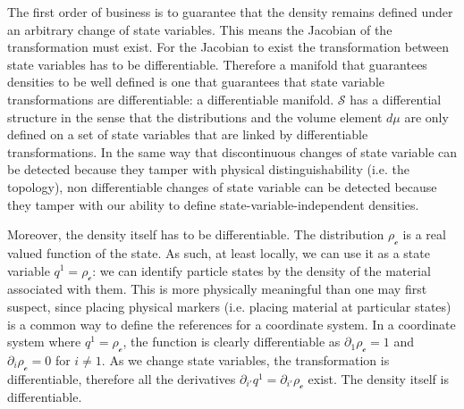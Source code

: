 \documentclass[aps,pra,10pt,twocolumn,floatfix,nofootinbib]{revtex4-1}
\numberwithin{equation}{section}
\theoremstyle{definition}
\begin{document}
The first order of business is to guarantee that the density remains defined under an arbitrary change of state variables. This means the Jacobian of the transformation must exist. For the Jacobian to exist the transformation between state variables has to be differentiable. Therefore a manifold that guarantees densities to be well defined is one that guarantees that state variable transformations are differentiable: a differentiable manifold. $\mathcal{S}$ has a differential structure in the sense that the distributions and the volume element $d\mu$ are only defined on a set of state variables that are linked by differentiable transformations. In the same way that discontinuous changes of state variable can be detected because they tamper with physical distinguishability (i.e. the topology), non differentiable changes of state variable can be detected because they tamper with our ability to define state-variable-independent densities.

Moreover, the density itself has to be differentiable. The distribution $\rho_\mathcal{c}$ is a real valued function of the state. As such, at least locally, we can use it as a state variable $q^1=\rho_\mathcal{c}$: we can identify particle states by the density of the material associated with them. This is more physically meaningful than one may first suspect, since placing physical markers (i.e. placing material at particular states) is a common way to define the references for a coordinate system. In a coordinate system where $q^1=\rho_\mathcal{c}$, the function is clearly differentiable as $\partial_1 \rho_\mathcal{c} = 1$ and $\partial_i \rho_\mathcal{c} = 0$ for $i \neq 1$. As we change state variables, the transformation is differentiable, therefore all the derivatives $\partial_{i'} q^1 = \partial_{i'} \rho_\mathcal{c}$ exist. The density itself is differentiable.
\end{document}
